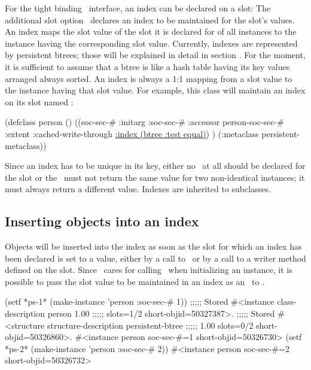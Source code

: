For the tight binding \clos\ interface, an index can be declared on a
slot: The additional slot option
\ declares an index to be maintained for the slot's
values.  An index maps the slot value of the slot it is declared for
of all instances to the instance having the corresponding slot value.
Currently, indexes are represented by persistent btrees; those will be
explained in detail in section . For the
moment, it is sufficient to assume that a btree is like a hash table
having its key values arranged always sorted.  An index is always a
1:1 mapping from a slot value to the instance having that slot value.
For example, this class will maintain an index on its slot named
:
\begin{CompactCode}
\listener{}(defclass person ()
              ((soc-sec-# :initarg :soc-sec-#
                          :accessor person-soc-sec-#
                          :extent :cached-write-through
                          \underline{:index (btree :test equal)})
               )
              (:metaclass persistent-metaclass))
\end{CompactCode}

Since an index has to be unique in its key, either no
\ at all should be declared for the slot or the
\ must not return the same value for two non-identical
instances; it must always return a different value. Indexes are
inherited to subclasses.

\subsection{Inserting objects into an index}

Objects will be inserted into the index as soon as
the slot for which an index has been declared is set to a value,
either by a call to \ or by a call to a
writer method defined on the slot. Since \plob\ cares for calling
\ when initializing an instance, it is
possible to pass the slot value to be maintained in an index as an
\ to .
\begin{CompactCode}
\listener{}(setf *ps-1* (make-instance 'person :soc-sec-# 1))
;;;;; Stored #<instance class-description person 1.00
;;;;;                   slots=1/2 short-objid=50327387>.
;;;;; Stored #<structure structure-description persistent-btree
;;;;;                    1.00 slots=0/2 short-objid=50326860>.
#<instance person soc-sec-#=1 short-objid=50326730>
\listener{}(setf *ps-2* (make-instance 'person :soc-sec-# 2))
#<instance person soc-sec-#=2 short-objid=50326732>
\end{CompactCode}

